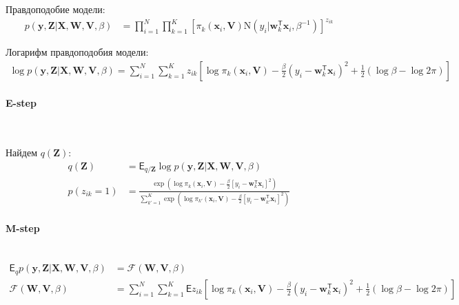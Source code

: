 \documentclass[12pt, twoside]{article}
\numberwithin{equation}{section}
\begin{document}
Правдоподобие модели:
\begin{equation}
\label{eq:st:3}
\begin{aligned}
p\left(\textbf{y}, \textbf{Z}|\textbf{X}, \textbf{W}, \textbf{V}, \beta\right) &= \prod_{i=1}^{N}\prod_{k=1}^{K}\left[\pi_{k}\left(\textbf{x}_i,\textbf{V}\right)\text{N}\left(y_i|\textbf{w}_{k}^{\mathsf{T}}\textbf{x}_i, \beta^{-1}\right)\right]^{z_{ik}}
\end{aligned}
\end{equation}

Логарифм правдоподобия модели:
\begin{equation}
\label{eq:st:4}
\begin{aligned}
\log p\left(\textbf{y}, \textbf{Z}|\textbf{X}, \textbf{W}, \textbf{V}, \beta\right) = \sum_{i=1}^{N}\sum_{k=1}^{K}z_{ik}\left[\log\pi_k\left(\textbf{x}_i, \textbf{V}\right) - \frac{\beta}{2}\left(y_i - \textbf{w}_{k}^{\mathsf{T}}\textbf{x}_i\right)^{2}+\frac{1}{2}\left(\log\beta-\log2\pi\right)\right]
\end{aligned}
\end{equation}

\paragraph{E-step}~

Найдем $q\left(\textbf{Z}\right)$:
\begin{equation}
\label{eq:st:5}
\begin{aligned}
q\left(\textbf{Z}\right) &= \mathsf{E}_{q/\textbf{Z}}\log p\left(\textbf{y}, \textbf{Z}|\textbf{X}, \textbf{W}, \textbf{V}, \beta\right) \\
p\left(z_{ik} = 1\right) &= \frac{\exp\left(\log\pi_{k}\left(\textbf{x}_{i}, \textbf{V}\right) - \frac{\beta}{2}\left[y_{i} - \textbf{w}_{k}^{\mathsf{T}}\textbf{x}_{i}\right]^{2}\right)}{\sum_{k'=1}^{K}\exp\left(\log\pi_{k'}\left(\textbf{x}_{i}, \textbf{V}\right) - \frac{\beta}{2}\left[y_{i} - \textbf{w}_{k'}^{\mathsf{T}}\textbf{x}_{i}\right]^{2}\right)}
\end{aligned}
\end{equation}

\paragraph{M-step}~
\begin{equation}
\label{eq:st:6}
\begin{aligned}
\mathsf{E}_{q} p\left(\textbf{y}, \textbf{Z}|\textbf{X}, \textbf{W}, \textbf{V}, \beta\right) &= \mathcal{F}\left(\textbf{W}, \textbf{V}, \beta\right) \\
\mathcal{F}\left(\textbf{W}, \textbf{V}, \beta\right) &= \sum_{i=1}^{N}\sum_{k=1}^{K}\mathsf{E}z_{ik}\left[\log\pi_k\left(\textbf{x}_i, \textbf{V}\right) - \frac{\beta}{2}\left(y_i - \textbf{w}_{k}^{\mathsf{T}}\textbf{x}_i\right)^{2} +\frac{1}{2}\left(\log\beta-\log2\pi\right)\right]
\end{aligned}
\end{equation}
\end{document}
